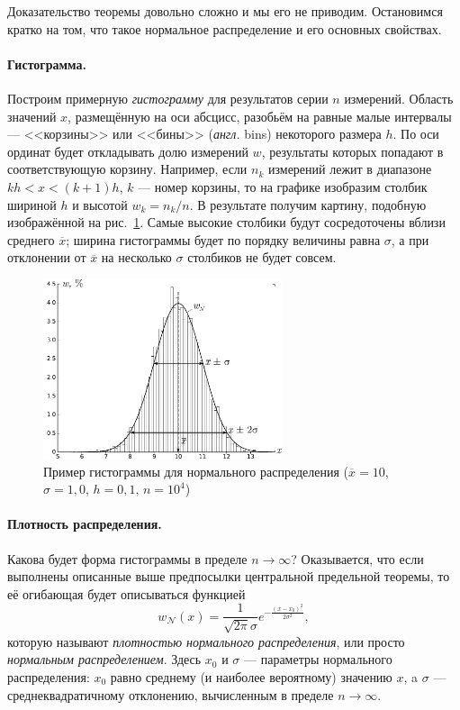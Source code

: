 \documentclass[10pt]{article}
\begin{document}
Доказательство теоремы довольно сложно и мы его не приводим. Остановимся
кратко на том, что такое нормальное распределение и его основных свойствах.

\paragraph{Гистограмма.}

Построим примерную \emph{гистограмму} для результатов серии $n$ измерений.
Область значений $x$, размещённую на оси абсцисс, разобьём на равные
малые интервалы --- <<корзины>>
или <<бины>> (\emph{англ.} bins) некоторого
размера $h$. По оси ординат будет откладывать долю измерений $w$,
результаты которых попадают в соответствующую корзину. Например, если
$n_{k}$ измерений лежит в диапазоне $kh<x<(k+1)h$, $k$ ---
номер корзины, то на графике изобразим столбик шириной $h$ и высотой
$w_{k}=n_{k}/n$. В результате получим картину, подобную изображённой
на рис.~\ref{fig:normhist}. Самые высокие столбики будут сосредоточены
вблизи среднего $\overline{x}$; ширина гистограммы будет по порядку
величины равна $\sigma$, а при отклонении от $\overline{x}$ на несколько
$\sigma$ столбиков не будет совсем.

\begin{figure}
\begin{centering}
\includegraphics[width=7cm]{images/normhist.pdf}
\par\end{centering}
\caption{\label{fig:normhist}Пример гистограммы для нормального распределения
($\overline{x}=10$, $\sigma=1{,}0$, $h=0{,}1$, $n=10^{4}$)}
\end{figure}


\paragraph{Плотность распределения.}

Какова будет форма гистограммы в пределе $n\to\infty$? Оказывается,
что если выполнены описанные выше предпосылки центральной предельной
теоремы, то её огибающая будет описываться функцией
\begin{equation}
\boxed{w_{\mathcal{N}}\!\left(x\right)=\frac{1}{\sqrt{2\pi}\sigma}e^{-\tfrac{(x-x_{0})^{2}}{2\sigma^{2}}}},\label{eq:normal}
\end{equation}
которую называют \emph{плотностью нормального распределения}, или
просто \emph{нормальным распределением}. Здесь $x_{0}$ и $\sigma$
--- параметры нормального распределения: $x_{0}$ равно
среднему (и наиболее вероятному) значению $x$, a $\sigma$ ---
среднеквадратичному отклонению, вычисленным в пределе $n\to\infty$. 
\end{document}
